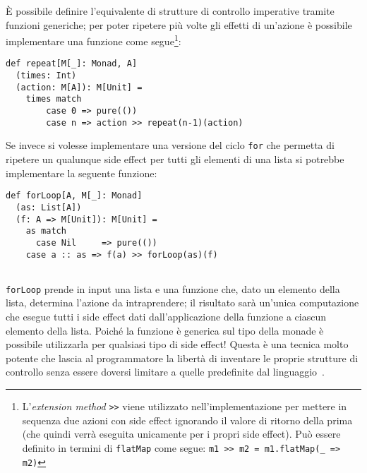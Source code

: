 È possibile definire l'equivalente di strutture di controllo imperative tramite funzioni generiche; per poter ripetere più volte gli effetti di un'azione è possibile implementare una funzione come segue\footnote{L'\emph{extension method} \lstinline{>>} viene utilizzato nell'implementazione per mettere in sequenza due azioni con side effect ignorando il valore di ritorno della prima (che quindi verrà eseguita unicamente per i propri side effect). Può essere definito in termini di \lstinline{flatMap} come segue: \lstinline{m1 >> m2 = m1.flatMap(_ => m2)}}:
\begin{lstlisting}[language=scala3]
def repeat[M[_]: Monad, A]
  (times: Int)
  (action: M[A]): M[Unit] =
	times match
		case 0 => pure(())
		case n => action >> repeat(n-1)(action)
\end{lstlisting}

Se invece si volesse implementare una versione del ciclo \lstinline{for} che permetta di ripetere un qualunque side effect per tutti gli elementi di una lista si potrebbe implementare la seguente funzione:
\begin{lstlisting}[language=scala3]
def forLoop[A, M[_]: Monad]
  (as: List[A])
  (f: A => M[Unit]): M[Unit] = 
	as match 
	  case Nil     => pure(())	
    case a :: as => f(a) >> forLoop(as)(f)
		
\end{lstlisting}
\lstinline{forLoop} prende in input una lista e una funzione che, dato un elemento della lista, determina l'azione da intraprendere; il risultato sarà un'unica computazione che esegue tutti i side effect dati dall'applicazione della funzione a ciascun elemento della lista. Poiché la funzione è generica sul tipo della monade è possibile utilizzarla per qualsiasi tipo di side effect!
Questa è una tecnica molto potente che lascia al programmatore la libertà di inventare le proprie strutture di controllo senza essere doversi limitare a quelle predefinite dal linguaggio~\cite{cit:tackling-the-awkward-squad}.




